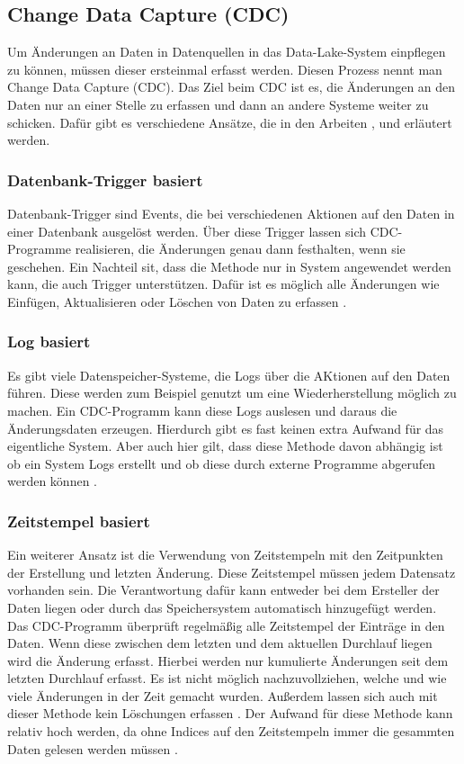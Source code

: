 \subsection{Change Data Capture (CDC)}

Um Änderungen an Daten in Datenquellen in das Data-Lake-System einpflegen zu können, müssen dieser ersteinmal erfasst werden.
Diesen Prozess nennt man Change Data Capture (CDC).
Das Ziel beim CDC ist es, die Änderungen an den Daten nur an einer Stelle zu erfassen und dann an andere Systeme weiter zu schicken.
Dafür gibt es verschiedene Ansätze, die in den Arbeiten \parencite{delta-view_gen}, \parencite{cdc_in_nosql} und \parencite{boeing} erläutert werden.

\subsubsection{Datenbank-Trigger basiert}
Datenbank-Trigger sind Events, die bei verschiedenen Aktionen auf den Daten in einer Datenbank ausgelöst werden.
Über diese Trigger lassen sich CDC-Programme realisieren, die Änderungen genau dann festhalten, wenn sie geschehen.
Ein Nachteil sit, dass die Methode nur in System angewendet werden kann, die auch Trigger unterstützen.
Dafür ist es möglich alle Änderungen wie Einfügen, Aktualisieren oder Löschen von Daten zu erfassen \parencite{boeing}.

\subsubsection{Log basiert}
Es gibt viele Datenspeicher-Systeme, die Logs über die AKtionen auf den Daten führen.
Diese werden zum Beispiel genutzt um eine Wiederherstellung möglich zu machen.
Ein CDC-Programm kann diese Logs auslesen und daraus die Änderungsdaten erzeugen.
Hierdurch gibt es fast keinen extra Aufwand für das eigentliche System.
Aber auch hier gilt, dass diese Methode davon abhängig ist ob ein System Logs erstellt und ob diese durch externe Programme abgerufen werden können \parencite{delta-view_gen}.


\subsubsection{Zeitstempel basiert}
Ein weiterer Ansatz ist die Verwendung von Zeitstempeln mit den Zeitpunkten der Erstellung und letzten Änderung.
Diese Zeitstempel müssen jedem Datensatz vorhanden sein.
Die Verantwortung dafür kann entweder bei dem Ersteller der Daten liegen oder durch das Speichersystem automatisch hinzugefügt werden.
Das CDC-Programm überprüft regelmäßig alle Zeitstempel der Einträge in den Daten.
Wenn diese zwischen dem letzten und dem aktuellen Durchlauf liegen wird die Änderung erfasst.
Hierbei werden nur kumulierte Änderungen seit dem letzten Durchlauf erfasst.
Es ist nicht möglich nachzuvollziehen, welche und wie viele Änderungen in der Zeit gemacht wurden.
Außerdem lassen sich auch mit dieser Methode kein Löschungen erfassen \parencite{delta-view_gen}.
Der Aufwand für diese Methode kann relativ hoch werden, da ohne Indices auf den Zeitstempeln immer die gesammten Daten gelesen werden müssen \cite{boeing}.

